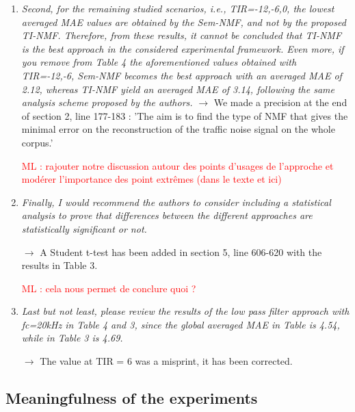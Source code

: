 \documentclass[10pt]{article}
\newcommand{\ml}[1]{\textcolor{red}{ML : #1}}
\begin{document}
\begin{enumerate}
\item \emph{Second, for the remaining studied scenarios, i.e., TIR={-12,-6,0}, the lowest averaged MAE values are obtained by the Sem-NMF, and not by the proposed TI-NMF.
Therefore, from these results, it cannot be concluded that TI-NMF is the best approach in the considered experimental framework. Even more, if you remove from Table 4 the aforementioned values obtained with TIR={-12,-6}, Sem-NMF becomes the best approach with an averaged MAE of 2.12, whereas TI-NMF yield an averaged MAE of 3.14, following the same analysis scheme proposed by the authors.}
$\rightarrow$ We made a precision at the end of section 2, line 177-183 : 'The aim is to find the type of NMF that gives the minimal error on the reconstruction of the traffic noise signal on the whole corpus.'

\ml{rajouter notre discussion autour des points d'usages de l'approche et modérer l'importance des point extrêmes (dans le texte et ici)}

\item \emph{Finally, I would recommend the authors to consider including a statistical analysis to prove that differences between the different approaches are statistically significant or not.}

$\rightarrow$ A Student t-test has been added in section 5, line 606-620 with the results in Table 3.

\ml{cela nous permet de conclure quoi ?}

\item \emph{Last but not least, please review the results of the low pass filter approach with fc=20kHz in Table 4 and 3, since the global averaged MAE in Table is 4.54, while in Table 3 is 4.69.}

$\rightarrow$ The value at TIR = 6 was a misprint, it has been corrected.


\end{enumerate}

\subsection{Meaningfulness of the experiments}
\end{document}
